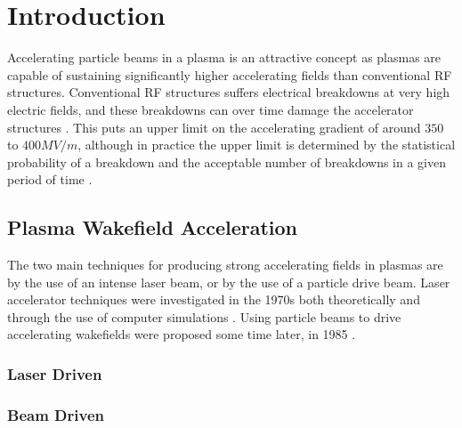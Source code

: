 %
%

\chapter{Introduction}
\label{Ch:Intro}

Accelerating particle beams in a plasma is an attractive concept as plasmas are capable of sustaining significantly higher accelerating fields than conventional RF structures. Conventional RF structures suffers electrical breakdowns at very high electric fields, and these breakdowns can over time damage the accelerator structures \cite{braun:2003}. This puts an upper limit on the accelerating gradient of around $350$ to $400\unit{MV/m}$, although in practice the upper limit is determined by the statistical probability of a breakdown and the acceptable number of breakdowns in a given period of time \cite{pritzkau:2002}.

\section{Plasma Wakefield Acceleration}
\label{Int:PWFA}

The two main techniques for producing strong accelerating fields in plasmas are by the use of an intense laser beam, or by the use of a particle drive beam. Laser accelerator techniques were investigated in the 1970s both theoretically \cite{chan:1971,palmer:1972} and through the use of computer simulations \cite{tajima:1979}. Using particle beams to drive accelerating wakefields were proposed some time later, in 1985 \cite{chen:1985}.



\subsection{Laser Driven}
\label{Int:LWFA}

\subsection{Beam Driven}
\label{Int:PDPWFA}

